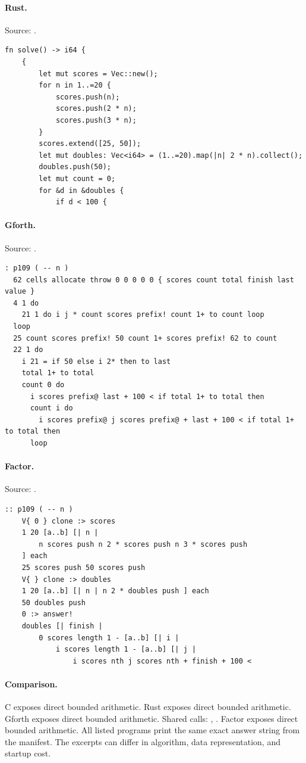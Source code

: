 \paragraph{Rust.} Source: .
\begin{lstlisting}
fn solve() -> i64 {
    {
        let mut scores = Vec::new();
        for n in 1..=20 {
            scores.push(n);
            scores.push(2 * n);
            scores.push(3 * n);
        }
        scores.extend([25, 50]);
        let mut doubles: Vec<i64> = (1..=20).map(|n| 2 * n).collect();
        doubles.push(50);
        let mut count = 0;
        for &d in &doubles {
            if d < 100 {
\end{lstlisting}

\paragraph{Gforth.} Source: .
\begin{lstlisting}
: p109 ( -- n )
  62 cells allocate throw 0 0 0 0 0 { scores count total finish last value }
  4 1 do
    21 1 do i j * count scores prefix! count 1+ to count loop
  loop
  25 count scores prefix! 50 count 1+ scores prefix! 62 to count
  22 1 do
    i 21 = if 50 else i 2* then to last
    total 1+ to total
    count 0 do
      i scores prefix@ last + 100 < if total 1+ to total then
      count i do
        i scores prefix@ j scores prefix@ + last + 100 < if total 1+ to total then
      loop
\end{lstlisting}

\paragraph{Factor.} Source: .
\begin{lstlisting}
:: p109 ( -- n )
    V{ 0 } clone :> scores
    1 20 [a..b] [| n |
        n scores push n 2 * scores push n 3 * scores push
    ] each
    25 scores push 50 scores push
    V{ } clone :> doubles
    1 20 [a..b] [| n | n 2 * doubles push ] each
    50 doubles push
    0 :> answer!
    doubles [| finish |
        0 scores length 1 - [a..b] [| i |
            i scores length 1 - [a..b] [| j |
                i scores nth j scores nth + finish + 100 <
\end{lstlisting}

\paragraph{Comparison.}
C exposes direct bounded arithmetic. Rust exposes direct bounded arithmetic. Gforth exposes direct bounded arithmetic. Shared calls: \texttt{}, \texttt{}. Factor exposes direct bounded arithmetic.
All listed programs print the same exact answer string from the manifest. The excerpts can differ in algorithm, data representation, and startup cost.

